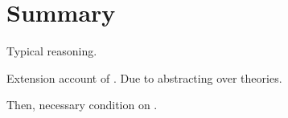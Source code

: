 

\section{Summary}
\label{cha:typical:sec:summ}

\begin{note}
  Typical reasoning.

  Extension account of \tor{}.
  Due to abstracting over theories.

  Then, necessary condition on \tR{}.
\end{note}







